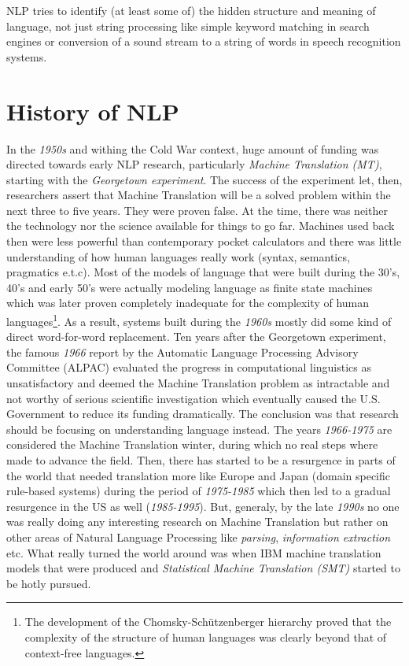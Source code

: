 \documentclass[a4paper,10pt]{report}
\begin{document}
NLP tries to identify (at least some of) the hidden structure and meaning of language, not just string processing like simple keyword matching in search engines or conversion of a sound stream to a string of words in speech recognition systems.

\section*{History of NLP}
In the \emph{1950s} and withing the Cold War context, huge amount of funding was directed towards early NLP research, particularly \emph{Machine Translation (MT)}, starting with the \emph{Georgetown experiment}. The success of the experiment let, then, researchers assert that Machine Translation will be a solved problem within the next three to five years. They were proven false. At the time, there was neither the technology nor the science available for things to go far. Machines used back then were less powerful than contemporary pocket calculators and there was little understanding of how human languages really work (syntax, semantics, pragmatics e.t.c). Most of the models of language that were built during the 30's, 40's and early 50's were actually modeling language as finite state machines which was later proven completely inadequate for the complexity of human languages\footnote{The development of the Chomsky-Schützenberger hierarchy proved that the complexity of the structure of human languages was clearly beyond that of context-free languages.}. As a result, systems built during the \emph{1960s} mostly did some kind of direct word-for-word replacement. Ten years after the Georgetown experiment, the famous \emph{1966} report by the Automatic Language Processing Advisory Committee (ALPAC) evaluated the progress in computational linguistics as unsatisfactory and deemed the Machine Translation problem as intractable and not worthy of serious scientific investigation which eventually caused the U.S. Government to reduce its funding dramatically. The conclusion was that research should be focusing on understanding language instead. The years \emph{1966-1975} are considered the Machine Translation winter, during which no real steps where made to advance the field. Then, there has started to be a resurgence in parts of the world that needed translation more like Europe and Japan (domain specific rule-based systems) during the period of \emph{1975-1985} which then led to a gradual resurgence in the US as well (\emph{1985-1995}). But, generaly, by the late \emph{1990s} no one was really doing any interesting research on Machine Translation but rather on other areas of Natural Language Processing like \emph{parsing}, \emph{information extraction} etc. What really turned the world around was when IBM machine translation models
that were produced and \emph{Statistical Machine Translation (SMT)} started to be hotly pursued.
\end{document}
